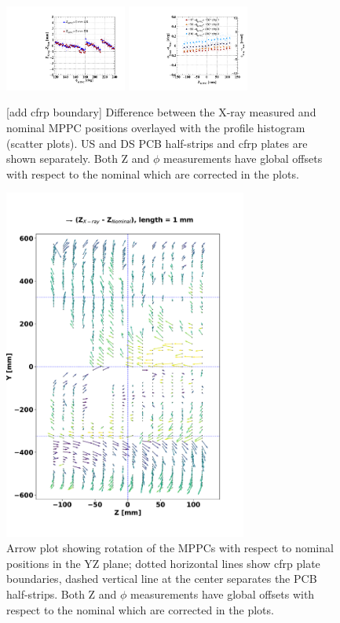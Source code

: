 \begin{figure}
\includegraphics[width=4cm]{plots/dz_boardrotation.pdf}
\includegraphics[width=4cm]{plots/dphi_boardrotation.pdf}\\
\caption{[add cfrp boundary]
Difference between the X-ray measured and nominal MPPC positions
overlayed with the profile histogram (scatter plots).
US and DS PCB half-strips and cfrp plates are shown separately.
Both Z and $\phi$ measurements have global offsets with respect to the 
nominal which are corrected in the plots.
}
\label{fig:rotation1}
\end{figure}

\begin{figure}
\begin{center}
\includegraphics[width=8cm]{plots/dzdy2017_rx.pdf}
\caption{Arrow plot showing rotation of the MPPCs with respect to nominal
positions in the YZ plane; dotted horizontal lines show cfrp plate boundaries,
dashed vertical line at the center separates the PCB half-strips.
Both Z and $\phi$ measurements have global offsets with respect to the 
nominal which are corrected in the plots.
}
\label{fig:rotation2}
\end{center}
\end{figure}


